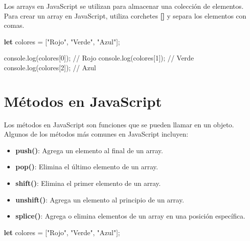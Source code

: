 \documentclass[
  a4paper,
  DIV=11,
  numbers=noendperiod,
  onepage,
  openany]{scrreprt}
\newenvironment{Shaded}{\begin{snugshade}}{\end{snugshade}}
\newcommand{\BuiltInTok}[1]{\textcolor[rgb]{0.00,0.23,0.31}{#1}}
\newcommand{\CommentTok}[1]{\textcolor[rgb]{0.37,0.37,0.37}{#1}}
\newcommand{\DecValTok}[1]{\textcolor[rgb]{0.68,0.00,0.00}{#1}}
\newcommand{\FunctionTok}[1]{\textcolor[rgb]{0.28,0.35,0.67}{#1}}
\newcommand{\KeywordTok}[1]{\textcolor[rgb]{0.00,0.23,0.31}{\textbf{#1}}}
\newcommand{\NormalTok}[1]{\textcolor[rgb]{0.00,0.23,0.31}{#1}}
\newcommand{\OperatorTok}[1]{\textcolor[rgb]{0.37,0.37,0.37}{#1}}
\newcommand{\StringTok}[1]{\textcolor[rgb]{0.13,0.47,0.30}{#1}}
\providecommand{\tightlist}{%
  \setlength{\itemsep}{0pt}\setlength{\parskip}{0pt}}\usepackage{longtable,booktabs,array}
\begin{document}
\begin{tcolorbox}
Los arrays en JavaScript se utilizan para almacenar una colección de
elementos. Para crear un array en JavaScript, utiliza corchetes
\textbf{{[}{]}} y separa los elementos con comas.

\begin{Shaded}
\begin{Highlighting}[]
\KeywordTok{let}\NormalTok{ colores }\OperatorTok{=}\NormalTok{ [}\StringTok{"Rojo"}\OperatorTok{,} \StringTok{"Verde"}\OperatorTok{,} \StringTok{"Azul"}\NormalTok{]}\OperatorTok{;}

\BuiltInTok{console}\OperatorTok{.}\FunctionTok{log}\NormalTok{(colores[}\DecValTok{0}\NormalTok{])}\OperatorTok{;} \CommentTok{// Rojo}
\BuiltInTok{console}\OperatorTok{.}\FunctionTok{log}\NormalTok{(colores[}\DecValTok{1}\NormalTok{])}\OperatorTok{;} \CommentTok{// Verde}
\BuiltInTok{console}\OperatorTok{.}\FunctionTok{log}\NormalTok{(colores[}\DecValTok{2}\NormalTok{])}\OperatorTok{;} \CommentTok{// Azul}
\end{Highlighting}
\end{Shaded}

\section{Métodos en JavaScript}\label{muxe9todos-en-javascript}

Los métodos en JavaScript son funciones que se pueden llamar en un
objeto. Algunos de los métodos más comunes en JavaScript incluyen:

\begin{itemize}
\tightlist
\item
  \textbf{push()}: Agrega un elemento al final de un array.
\item
  \textbf{pop()}: Elimina el último elemento de un array.
\item
  \textbf{shift()}: Elimina el primer elemento de un array.
\item
  \textbf{unshift()}: Agrega un elemento al principio de un array.
\item
  \textbf{splice()}: Agrega o elimina elementos de un array en una
  posición específica.
\end{itemize}

\begin{Shaded}
\begin{Highlighting}[]
\KeywordTok{let}\NormalTok{ colores }\OperatorTok{=}\NormalTok{ [}\StringTok{"Rojo"}\OperatorTok{,} \StringTok{"Verde"}\OperatorTok{,} \StringTok{"Azul"}\NormalTok{]}\OperatorTok{;}


\end{Highlighting}
\end{Shaded}
\end{tcolorbox}
\end{document}
